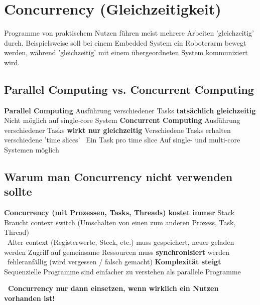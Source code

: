\section{Concurrency (Gleichzeitigkeit)}

Programme von praktischem Nutzen führen meist mehrere Arbeiten 'gleichzeitig' durch. Beispielsweise soll bei einem Embedded System ein Roboterarm 
bewegt werden, während 'gleichzeitig' mit einem übergeordneten System kommuniziert wird.


\subsection{Parallel Computing vs. Concurrent Computing}


\begin{outline}
    \1 \textbf{Parallel Computing}
        \2 Ausführung verschiedener Tasks \textbf{tatsächlich gleichzeitig}
        \2 Nicht möglich auf single-core System
    \1 \textbf{Concurrent Computing}
        \2 Ausführung verschiedener Tasks \textbf{wirkt nur gleichzeitig}
        \2 Verschiedene Tasks erhalten verschiedene 'time slices' \textrightarrow\ Ein Task pro time slice
        \2 Auf single- und multi-core Systemen möglich
\end{outline}

\columnbreak


\subsection{Warum man Concurrency nicht verwenden sollte}

\begin{outline}
    \1 \textbf{Concurrency (mit Prozessen, Tasks, Threads) kostet immer}
        \2 Stack
        \2 Braucht context switch (Umschalten von einen zum anderen Prozess, Task, Thread) \\
            \textrightarrow\ Alter context (Registerwerte, Steck, etc.) muss gespeichert, neuer geladen werden 
        \2 Zugriff auf gemeinsame Ressourcen muss \textbf{synchronisiert} werden \\
            \textrightarrow\ fehleranfällig (wird vergessen / falsch gemacht)
    \1 \textbf{Komplexität steigt}
        \2 Sequenzielle Programme sind einfacher zu verstehen als parallele Programme
\end{outline}

\vspace{0.1cm}

\textbf{ \textrightarrow\ Concurrency nur dann einsetzen, wenn wirklich ein Nutzen vorhanden ist!}


